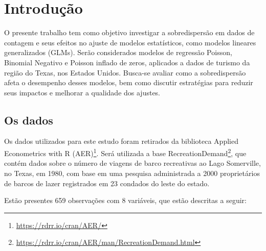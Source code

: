 \documentclass[
  twocolumn]{article}
\author{}
\date{\vspace{-2.5em}}
\begin{document}

\section{Introdução}\label{introduuxe7uxe3o}

O presente trabalho tem como objetivo investigar a sobredispersão em
dados de contagem e seus efeitos no ajuste de modelos estatísticos, como
modelos lineares generalizados (GLMs). Serão considerados modelos de
regressão Poisson, Binomial Negativo e Poisson inflado de zeros,
aplicados a dados de turismo da região do Texas, nos Estados Unidos.
Busca-se avaliar como a sobredispersão afeta o desempenho desses
modelos, bem como discutir estratégias para reduzir seus impactos e
melhorar a qualidade dos ajustes.

\subsection{Os dados}\label{os-dados}

Os dados utilizados para este estudo foram retirados da biblioteca
Applied Econometrics with R (AER)\footnote{\url{https://rdrr.io/cran/AER/}}.
Será utilizada a base RecreationDemand\footnote{\url{https://rdrr.io/cran/AER/man/RecreationDemand.html}},
que contém dados sobre o número de viagens de barco recreativas ao Lago
Somerville, no Texas, em 1980, com base em uma pesquisa administrada a
2000 proprietários de barcos de lazer registrados em 23 condados do
leste do estado.

Estão presentes 659 observações com 8 variáveis, que estão descritas a
seguir:
\end{document}
